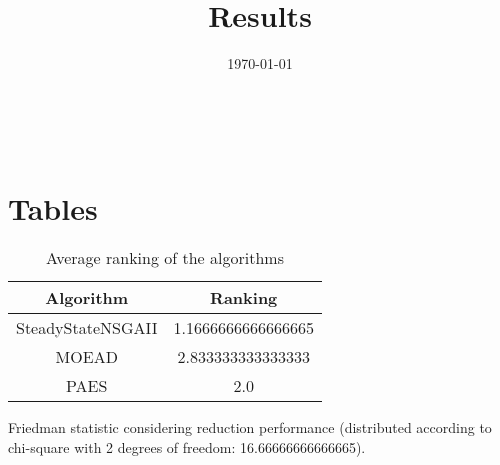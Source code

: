 \documentclass{article}
\title{Results}
\author{}
\date{\today}
\begin{document}
\oddsidemargin 0in \topmargin 0in\maketitle
\
\section{Tables}
\begin{table}[!htp]
\centering
\caption{Average ranking of the algorithms}
\begin{tabular}{c|c}
Algorithm&Ranking\\
\hline
SteadyStateNSGAII&1.1666666666666665\\
MOEAD&2.833333333333333\\
PAES&2.0\\
\end{tabular}
\end{table}


Friedman statistic considering reduction performance (distributed according to chi-square with 2 degrees of freedom: 16.66666666666665).
\end{document}
